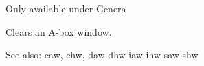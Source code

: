 
Only available under Genera

Clears an A-box window.

See also: caw, chw, daw dhw iaw ihw saw shw

